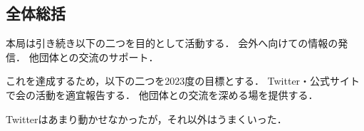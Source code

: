 \subsection*{全体総括}


本局は引き続き以下の二つを目的として活動する．
    会外へ向けての情報の発信．
    他団体との交流のサポート．
 
これを達成するため，以下の二つを2023度の目標とする．
    Twitter・公式サイトで会の活動を適宜報告する．
    他団体との交流を深める場を提供する．

Twitterはあまり動かせなかったが，それ以外はうまくいった．

